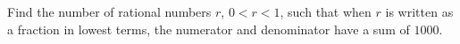 Find the number of rational numbers $r$,  $0<r<1$,  such that when $r$ is written as a fraction in lowest terms, the numerator and denominator have a sum of $1000$.